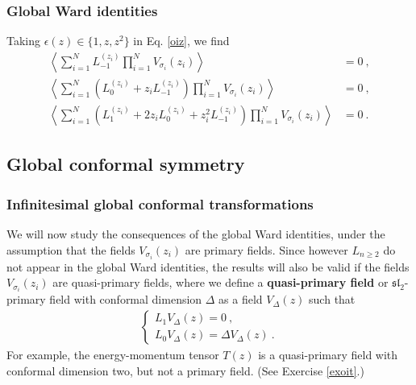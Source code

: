 \documentclass[12pt, a4paper, notitlepage, twoside]{report}
\numberwithin{equation}{section}
\theoremstyle{break}
\begin{document}
\subsubsection{Global Ward identities}

Taking $\epsilon(z)\in \{1,z,z^2\}$ in Eq. \eqref{oiz}, we find 
\begin{align}
\left\langle \sum_{i=1}^N L_{-1}^{(z_i)} \prod_{i=1}^N V_{\sigma_i}(z_i) \right\rangle &= 0 \ ,
\label{slz}
\\
\left\langle \sum_{i=1}^N \left( L_0^{(z_i)} + z_i L_{-1}^{(z_i)}\right) \prod_{i=1}^N V_{\sigma_i}(z_i) \right\rangle & = 0 \ ,
\label{sllz}
\\
\left\langle \sum_{i=1}^N \left( L_1^{(z_i)} + 2z_i L_0^{(z_i)} + z_i^2 L_{-1}^{(z_i)}\right) \prod_{i=1}^N V_{\sigma_i}(z_i) \right\rangle & = 0\ .
\label{slllz}
\end{align}

\subsection{Global conformal symmetry}\label{secgcs}

\subsubsection{Infinitesimal global conformal transformations}

We will now study the consequences of the global Ward identities, under the assumption that the fields $V_{\sigma_i}(z_i)$ are primary fields. Since however $L_{n\geq 2}$ do not appear in the global Ward identities, the results will also be valid if the fields $V_{\sigma_i}(z_i)$ are quasi-primary fields, where we define a \textbf{\boldmath quasi-primary field} or $\mathfrak{sl}_2$-primary field with conformal dimension $\Delta$ as a field $V_\Delta(z)$ such that 
\begin{align}
 \left\{\begin{array}{l}  L_1 V_\Delta(z) = 0 \ , 
\\
L_0 V_\Delta(z) = \Delta V_\Delta(z) \ .
\end{array}\right. 
\label{lolz}
\end{align}
For example, the energy-momentum tensor $T(z)$ is a quasi-primary field with conformal dimension two, but not a primary field. (See Exercise \eqref{exoit}.) 
\end{document}
